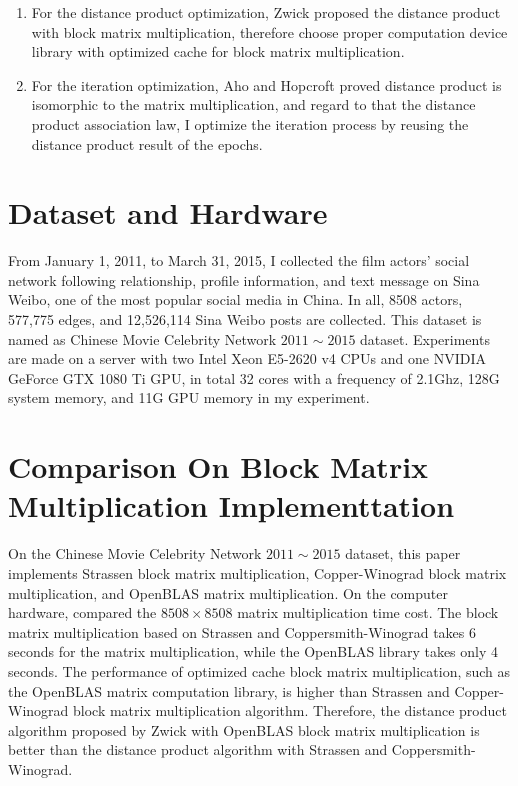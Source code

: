 \documentclass[review]{cvpr}
\begin{document}
\begin{enumerate}
\item For the distance product optimization, Zwick proposed the distance product with block matrix multiplication, therefore choose proper computation device library with optimized cache for block matrix multiplication.
\item For the iteration optimization, Aho and Hopcroft proved distance product is isomorphic to the matrix multiplication, and regard to that the distance product association law, I optimize the iteration process by reusing the distance product result of the epochs.
\end{enumerate}


\section{Dataset and Hardware}

From January 1, 2011, to March 31, 2015, I collected the film actors' social network following relationship, profile information,
and text message on Sina Weibo, one of the most popular social media in China.
In all, 8508 actors, 577,775 edges, and 12,526,114 Sina Weibo posts are collected.
This dataset is named as Chinese Movie Celebrity Network $2011\sim2015$ dataset.
Experiments are made on a server with two Intel Xeon E5-2620 v4 CPUs and one NVIDIA GeForce GTX 1080 Ti GPU, in total 32 cores with a frequency of 2.1Ghz, 128G system memory, and 11G GPU memory in my experiment.



\section{Comparison On Block Matrix Multiplication Implementtation}

On the Chinese Movie Celebrity Network $2011\sim2015$ dataset, this paper implements Strassen block matrix multiplication,
Copper-Winograd block matrix multiplication, and OpenBLAS matrix multiplication.
On the computer hardware, compared the $8508\times8508$ matrix multiplication time cost.
The block matrix multiplication based on Strassen and Coppersmith-Winograd takes 6 seconds for the matrix multiplication,
while the OpenBLAS library takes only 4 seconds.
The performance of optimized cache block matrix multiplication, such as the OpenBLAS matrix computation library,
is higher than Strassen and Copper-Winograd block matrix multiplication algorithm.
Therefore, the distance product algorithm proposed by Zwick with OpenBLAS block matrix multiplication is better than
the distance product algorithm with Strassen and Coppersmith-Winograd.
\end{document}

